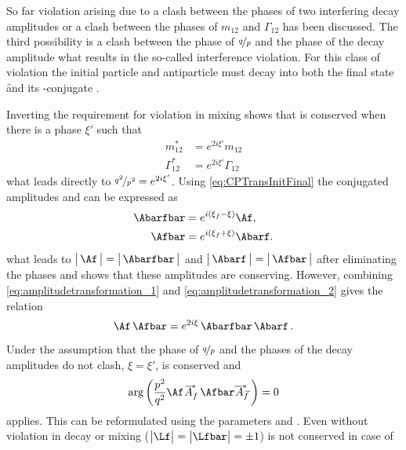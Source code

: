 So far \CP violation arising due to a clash between the phases of two interfering decay amplitudes or a clash between the phases of $m_{12}$ and $\Gamma_{12}$ has been discussed.
The third possibility is a clash between the phase of $\nicefrac{q}{p}$ and the phase of the decay amplitude what results in the so-called interference \CP violation.
For this class of \CP violation the initial particle \Paz and antiparticle \Pazb must decay into both the final state \f and its \CP-conjugate \fbar.

Inverting the requirement for \CP violation in mixing shows that \CP is conserved when there is a phase $\xi'$ such that
\begin{equation}
\begin{split}
m_{12}^\ast &= e^{2i\xi'}m_{12}\\
\Gamma_{12}^\ast &= e^{2i\xi'}\Gamma_{12}\label{eq:CPconservationMixing}
\end{split}
\end{equation}
what leads directly to $\nicefrac{q^2}{p^2} = e^{2i\xi'}$.
Using \cref{eq:CPTransInitFinal} the \CP conjugated amplitudes \Abarfbar and \Afbar can be expressed as
\begin{align}
\Abarfbar&=e^{i\left(\xi_f-\xi\right)}\Af,\label{eq:amplitudetransformation_1}\\
\Afbar&=e^{i\left(\xi_f+\xi\right)}\Abarf.\label{eq:amplitudetransformation_2}
\end{align}
what leads to $\big|\,\Af\,\big|=\big|\,\Abarfbar\,\big|$ and $\big|\,\Abarf\,\big|=\big|\,\Afbar\,\big|$ after eliminating the phases and shows that these amplitudes are \CP conserving.
However, combining \cref{eq:amplitudetransformation_1} and \cref{eq:amplitudetransformation_2} gives the relation
\begin{equation}
\Af\,\Afbar=e^{2i\xi}\,\Abarfbar\,\Abarf\,.
\end{equation}
Under the assumption that the phase of $\nicefrac{q}{p}$ and the phases of the decay amplitudes do not clash, \ie $\xi=\xi'$, \CP is conserved and
\begin{equation}
\arg\left(\frac{p^2}{q^2}\Af \,\overline{\kern -1.0pt A\kern -1.0pt}_{\kern 1.0pt f}^\ast\,\Afbar\overline{\kern -1.0pt \,A\kern -1.0pt}_{\kern 2.5pt\overline{\kern -1.5pt f\kern 1.5pt}}^\ast\right)=0
\end{equation}
applies.
This can be reformulated using the parameters \Lf and \Lfbar.
Even without \CP violation in decay or mixing ($\big|\Lf\big|=\big|\Lfbar\big| = \pm1$) \CP is not conserved in case of
